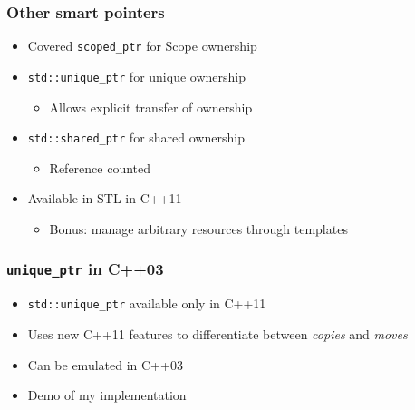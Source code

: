 

\begin{frame}[fragile]
    \frametitle{Other smart pointers}
    \begin{itemize}
        \item Covered \texttt{scoped\_ptr} for Scope ownership
        \item \texttt{std::unique\_ptr} for unique ownership
            \begin{itemize}
                \item Allows explicit transfer of ownership
            \end{itemize}
        \item \texttt{std::shared\_ptr} for shared ownership
            \begin{itemize}
                \item Reference counted
            \end{itemize}
        \item Available in STL in C++11
            \begin{itemize}
                \item Bonus: manage arbitrary resources through templates
            \end{itemize}
    \end{itemize}
\end{frame}

\begin{frame}[fragile]
    \frametitle{\texttt{unique\_ptr} in C++03}
    \begin{itemize}
        \item \texttt{std::unique\_ptr} available only in C++11
        \item Uses new C++11 features to differentiate between \emph{copies} and \emph{moves}
        \item Can be emulated in C++03
        \item Demo of my implementation
    \end{itemize}
\end{frame}



